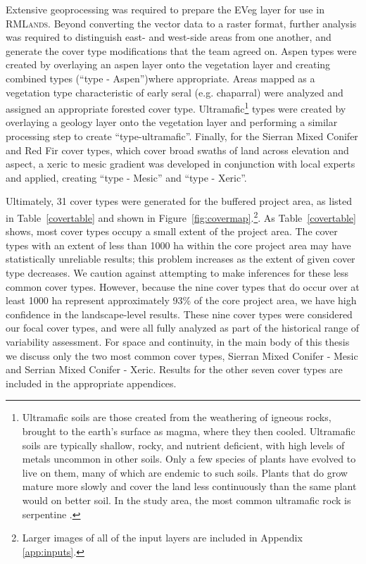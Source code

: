 Extensive geoprocessing was required to prepare the EVeg layer for use in \textsc{RMLands}. Beyond converting the vector data to a raster format, further analysis was required to distinguish east- and west-side areas from one another, and generate the cover type modifications that the team agreed on. Aspen types were created by overlaying an aspen layer onto the vegetation layer and creating combined types (``type - Aspen'')where appropriate. Areas mapped as a vegetation type characteristic of early seral (e.g. chaparral) were analyzed and assigned an appropriate forested cover type. Ultramafic\footnote{Ultramafic soils are those created from the weathering of igneous rocks, brought to the earth's surface as magma, where they then cooled. Ultramafic soils are typically shallow, rocky, and nutrient deficient, with high levels of metals uncommon in other soils. Only a few species of plants have evolved to live on them, many of which are endemic to such soils. Plants that do grow mature more slowly and cover the land less continuously than the same plant would on better soil. In the study area, the most common ultramafic rock is serpentine \citep{Safford2004}.} types were created by overlaying a geology layer onto the vegetation layer and performing a similar processing step to create ``type-ultramafic''. Finally, for the Sierran Mixed Conifer and Red Fir cover types, which cover broad swaths of land across elevation and aspect, a xeric to mesic gradient was developed in conjunction with local experts and applied, creating ``type - Mesic'' and ``type - Xeric''. 

Ultimately, 31 cover types were generated for the buffered project area, as listed in Table~\ref{covertable} and shown in Figure~\ref{fig:covermap}.\footnote{Larger images of all of the input layers are included in Appendix \ref{app:inputs}.}. %
As Table~\ref{covertable} shows, most cover types occupy a small extent of the project area. The cover types with an extent of less than 1000 ha within the core project area may have statistically unreliable results; this problem increases as the extent of given cover type decreases. We caution against attempting to make inferences for these less common cover types. However, because the nine cover types that do occur over at least 1000 ha represent approximately 93\% of the core project area, we have high confidence in the landscape-level results. These nine cover types were considered our focal cover types, and were all fully analyzed as part of the historical range of variability assessment. For space and continuity, in the main body of this thesis we discuss only the two most common cover types, Sierran Mixed Conifer - Mesic and Serrian Mixed Conifer - Xeric. Results for the other seven cover types are included in the appropriate appendices. 

